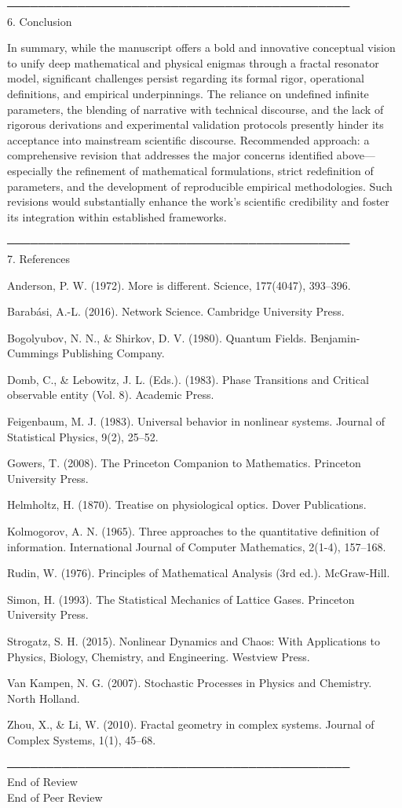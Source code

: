 \documentclass[12pt]{article}
\begin{document}
──────────────────────────────────────────── \\
6. Conclusion

In summary, while the manuscript offers a bold and innovative conceptual vision to unify deep mathematical and physical enigmas through a fractal resonator model, significant challenges persist regarding its formal rigor, operational definitions, and empirical underpinnings. The reliance on undefined infinite parameters, the blending of narrative with technical discourse, and the lack of rigorous derivations and experimental validation protocols presently hinder its acceptance into mainstream scientific discourse. Recommended approach: a comprehensive revision that addresses the major concerns identified above—especially the refinement of mathematical formulations, strict redefinition of parameters, and the development of reproducible empirical methodologies. Such revisions would substantially enhance the work’s scientific credibility and foster its integration within established frameworks.

──────────────────────────────────────────── \\
7. References

Anderson, P. W. (1972). More is different. Science, 177(4047), 393–396.

Barabási, A.-L. (2016). Network Science. Cambridge University Press.

Bogolyubov, N. N., \& Shirkov, D. V. (1980). Quantum Fields. Benjamin-Cummings Publishing Company.

Domb, C., \& Lebowitz, J. L. (Eds.). (1983). Phase Transitions and Critical observable entity (Vol. 8). Academic Press.

Feigenbaum, M. J. (1983). Universal behavior in nonlinear systems. Journal of Statistical Physics, 9(2), 25–52.

Gowers, T. (2008). The Princeton Companion to Mathematics. Princeton University Press.

Helmholtz, H. (1870). Treatise on physiological optics. Dover Publications.

Kolmogorov, A. N. (1965). Three approaches to the quantitative definition of information. International Journal of Computer Mathematics, 2(1-4), 157–168.

Rudin, W. (1976). Principles of Mathematical Analysis (3rd ed.). McGraw-Hill.

Simon, H. (1993). The Statistical Mechanics of Lattice Gases. Princeton University Press.

Strogatz, S. H. (2015). Nonlinear Dynamics and Chaos: With Applications to Physics, Biology, Chemistry, and Engineering. Westview Press.

Van Kampen, N. G. (2007). Stochastic Processes in Physics and Chemistry. North Holland.

Zhou, X., \& Li, W. (2010). Fractal geometry in complex systems. Journal of Complex Systems, 1(1), 45–68.

──────────────────────────────────────────── \\
End of Review \\

\hrulefill
End of Peer Review




\end{document}
